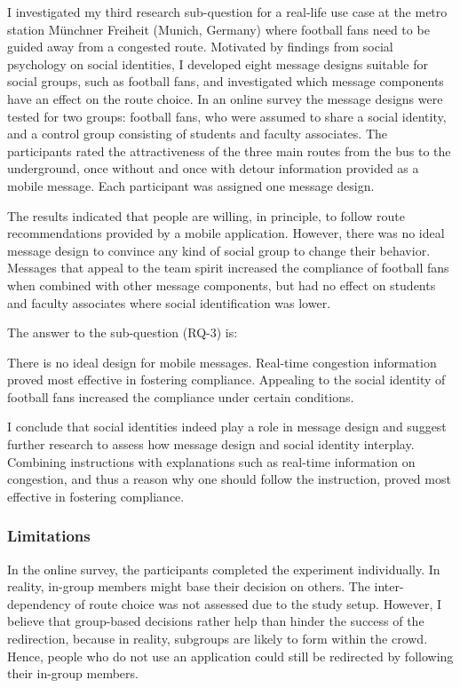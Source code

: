 I investigated my third research sub-question for a real-life use case at the metro station Münchner Freiheit (Munich, Germany) where football fans need to be guided away from a congested route. Motivated by findings from social psychology on social identities, I developed eight message designs suitable for social groups, such as football fans, and investigated which  message components have an effect on the route choice. In an online survey the message designs were tested for two groups: football fans, who were assumed to share a social identity, and a control group consisting of students and faculty associates. The participants rated the attractiveness of the three main routes from the bus to the underground, once without and once with detour information provided as a mobile message. Each participant was assigned one message design. 



The results indicated that people are willing, in principle, to follow route recommendations provided by a mobile application. However, there was no ideal message design to convince any kind of social group to change their behavior. 
Messages that appeal to the team spirit increased the compliance of football fans when combined with other message components,
but had no effect on students and faculty associates where social identification was lower. 

The answer to the sub-question (RQ-3) is:

\begin{tcolorbox}[title=How should mobile messages  be designed to improve the compliance of crowd members to follow route recommendations? (RQ-3)]
There is no ideal design for mobile messages. Real-time congestion information proved most effective in fostering compliance. Appealing to the social identity of football fans increased the compliance under certain conditions. 
\end{tcolorbox}


I conclude that social identities indeed play a role in message design and suggest further research to assess how message design and social identity interplay. Combining instructions with explanations such as real-time information on congestion, and thus a reason why one should follow the instruction, proved most effective in fostering compliance. 


\subsubsection{Limitations}
In the online survey, the participants completed the experiment individually. In reality, in-group
members might base their decision on others. The inter-dependency of route choice was not assessed due to the study setup. 
However, I believe that group-based decisions rather help than hinder the success of the redirection, because in
reality, subgroups are likely to form within the crowd. Hence, people who do not use an application could still be redirected by following their in-group members. 

